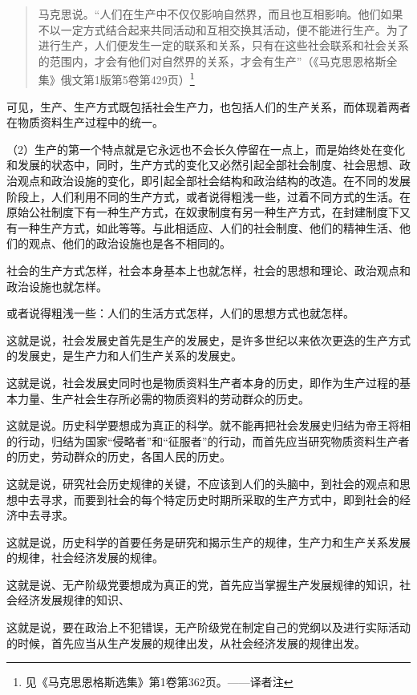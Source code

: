 \begin{quotation}
马克思说。“人们在生产中不仅仅影响自然界，而且也互相影响。他们如果不以一定方式结合起来共同活动和互相交换其活动，便不能进行生产。为了进行生产，人们便发生一定的联系和关系，只有在这些社会联系和社会关系的范围内，才会有他们对自然界的关系，才会有生产”（《马克思恩格斯全集》俄文第1版第5卷第429页）\footnote{见《马克思恩格斯选集》第1卷第362页。——译者注}
\end{quotation}

可见，生产、生产方式既包括社会生产力，也包括人们的生产关系，而体现着两者在物质资料生产过程中的统一。

（2）生产的第一个特点就是它永远也不会长久停留在一点上，而是始终处在变化和发展的状态中，同时，生产方式的变化又必然引起全部社会制度、社会思想、政治观点和政治设施的变化，即引起全部社会结构和政治结构的改造。在不同的发展阶段上，人们利用不同的生产方式，或者说得粗浅一些，过着不同方式的生活。在原始公社制度下有一种生产方式，在奴隶制度有另一种生产方式，在封建制度下又有一种生产方式，如此等等。与此相适应、人们的社会制度、他们的精神生活、他们的观点、他们的政治设施也是各不相同的。

社会的生产方式怎样，社会本身基本上也就怎样，社会的思想和理论、政治观点和政治设施也就怎样。

或者说得粗浅一些：人们的生活方式怎样，人们的思想方式也就怎样。

这就是说，社会发展史首先是生产的发展史，是许多世纪以来依次更迭的生产方式的发展史，是生产力和人们生产关系的发展史。

这就是说，社会发展史同时也是物质资料生产者本身的历史，即作为生产过程的基本力量、生产社会生存所必需的物质资料的劳动群众的历史。

这就是说。历史科学要想成为真正的科学。就不能再把社会发展史归结为帝王将相的行动，归结为国家“侵略者”和“征服者”的行动，而首先应当研究物质资料生产者的历史，劳动群众的历史，各国人民的历史。

这就是说，研究社会历史规律的关键，不应该到人们的头脑中，到社会的观点和思想中去寻求，而要到社会的每个特定历史时期所采取的生产方式中，即到社会的经济中去寻求。

这就是说，历史科学的首要任务是研究和揭示生产的规律，生产力和生产关系发展的规律，社会经济发展的规律。

这就是说、无产阶级党要想成为真正的党，首先应当掌握生产发展规律的知识，社会经济发展规律的知识、

这就是说，要在政治上不犯错误，无产阶级党在制定自己的党纲以及进行实际活动的时候，首先应当从生产发展的规律出发，从社会经济发展的规律出发。

